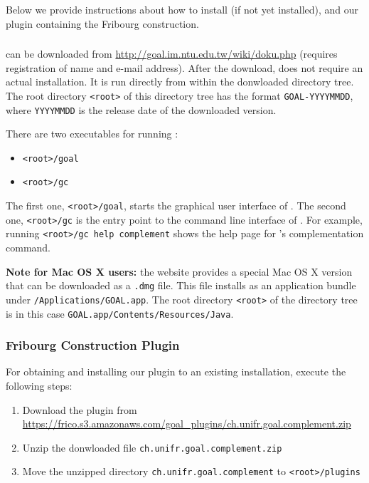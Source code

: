 Below we provide instructions about how to install \goal{} (if not yet installed), and our plugin containing the Fribourg construction.

\subsubsection{\goal}
\goal{} can be downloaded from \url{http://goal.im.ntu.edu.tw/wiki/doku.php} (requires registration of name and e-mail address). After the download, \goal{} does not require an actual installation. It is run directly from within the donwloaded directory tree. The root directory \texttt{<root>} of this directory tree has the format \texttt{GOAL-YYYYMMDD}, where \texttt{YYYYMMDD} is the release date of the downloaded \goal{} version.

There are two executables for running \goal:

\begin{itemize}
\item \texttt{<root>/goal}
\item \texttt{<root>/gc}
\end{itemize}

The first one, \texttt{<root>/goal}, starts the graphical user interface of \goal. The second one, \texttt{<root>/gc} is the entry point to the command line interface of \goal. For example, running \texttt{<root>/gc help complement} shows the help page for \goal's complementation command.

\textbf{Note for Mac OS X users:} the \goal{} website provides a special Mac OS X version that can be downloaded as a \texttt{.dmg} file. This file installs \goal{} as an application bundle under \texttt{/Applications/GOAL.app}. The root directory \texttt{<root>} of the \goal{} directory tree is in this case \texttt{GOAL.app/Contents/Resources/Java}.


\subsubsection{Fribourg Construction Plugin}

For obtaining and installing our plugin to an existing \goal{} installation, execute the following steps:

\begin{enumerate}
\item Download the plugin from \url{https://frico.s3.amazonaws.com/goal_plugins/ch.unifr.goal.complement.zip}
\item Unzip the donwloaded file \texttt{ch.unifr.goal.complement.zip}
\item Move the unzipped directory \texttt{ch.unifr.goal.complement} to \texttt{<root>/plugins}
\end{enumerate}

